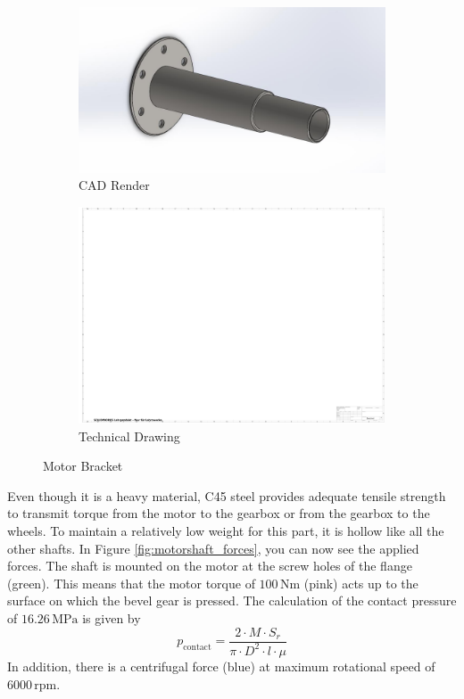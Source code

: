 \begin{figure}[ht!]
  \centering
  \begin{subfigure}{.5\textwidth}
    \centering
    \includegraphics[width=\linewidth]{texfiles/mech/eimg/propulsion/picture_motorshaft}
    \caption{CAD Render}
    \label{fig:CAD Motorshaft}
  \end{subfigure}%
  \begin{subfigure}{.4\textwidth}
    \centering
    \includegraphics[width=\linewidth]{texfiles/mech/eimg/propulsion/spaceholder_technical_drawing}
    \caption{Technical Drawing}
    \label{fig:TD Motorshaft}
  \end{subfigure}
  \caption{Motor Bracket}
  \label{fig:Motorshaft}
\end{figure}



Even though it is a heavy material, C45 steel provides adequate tensile strength to transmit torque from the motor to the gearbox or from the gearbox to the wheels. To maintain a relatively low weight for this part, it is hollow like all the other shafts. In Figure \ref{fig:motorshaft_forces}, you can now see the applied forces. The shaft is mounted on the motor at the screw holes of the flange (green). This means that the motor torque of \(100 \, \text{Nm}\) (pink) acts up to the surface on which the bevel gear is pressed. The calculation of the contact pressure of \(16.26 \, \text{MPa}\) is given by
\[
p_{\text{contact}}=\frac{2\cdot M\cdot S_r}{\pi \cdot D^2 \cdot l\cdot \mu}
\]
In addition, there is a centrifugal force (blue) at maximum rotational speed of \(6000 \, \text{rpm}\).

